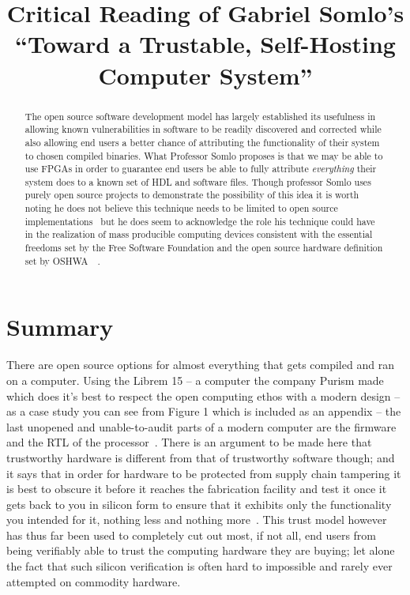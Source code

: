 \documentclass[conference]{IEEEtran}
\begin{document}
\title{Critical Reading of Gabriel Somlo's ``Toward a Trustable, Self-Hosting Computer System''}

\author{}

\maketitle

\begin{abstract}
The open source software development model has largely established its usefulness in allowing known vulnerabilities in software to be readily discovered and corrected while also allowing end users a better chance of attributing the functionality of their system to chosen compiled binaries. What Professor Somlo proposes is that we may be able to use FPGAs in order to guarantee end users be able to fully attribute \textit{{everything}} their system does to a known set of HDL and software files. Though professor Somlo uses purely open source projects to demonstrate the possibility of this idea it is worth noting he does not believe this technique needs to be limited to open source implementations~\cite{Somlo} but he does seem to acknowledge the role his technique could have in the realization of mass producible computing devices consistent with the essential freedoms set by the Free Software Foundation and the open source hardware definition set by OSHWA~\cite{fsf}~\cite{oshwa}.
\end{abstract}

\section{Summary}
There are open source options for almost everything that gets compiled and ran on a computer. Using the Librem 15 – a computer the company Purism made which does it’s best to respect the open computing ethos with a modern design – as a case study you can see from Figure 1 which is included as an appendix – the last unopened and unable-to-audit parts of a modern computer are the firmware and the RTL of the processor~\cite{bunnie}. There is an argument to be made here that trustworthy hardware is different from that of trustworthy software though; and it says that in order for hardware to be protected from supply chain tampering it is best to obscure it before it reaches the fabrication facility and test it once it gets back to you in silicon form to ensure that it exhibits only the functionality you intended for it, nothing less and nothing more~\cite{karri}. This trust model however has thus far been used to completely cut out most, if not all, end users from being verifiably able to trust the computing hardware they are buying; let alone the fact that such silicon verification is often hard to impossible and rarely ever attempted on commodity hardware.
\end{document}
